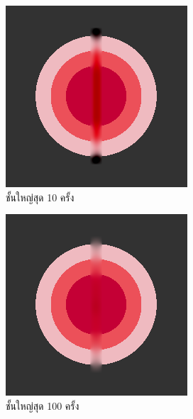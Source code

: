 \documentclass[hidelinks, a4paper,12pt]{article}
\numberwithin{equation}{section}							%
\numberwithin{equation}{section}
\begin{document}
{	\begin{figure}[H]
		\centering
		\begin{subfigure}{0.23\linewidth}
			\centering
			\includegraphics[width=0.8\linewidth]{images/just10enough/only10time.png}
			\caption{ชั้นใหญ่สุด 10 ครั้ง}
		\end{subfigure}
		\begin{subfigure}{0.23\linewidth}
			\centering
			\includegraphics[width=0.8\linewidth]{images/just10enough/only100time.png}
			\caption{ชั้นใหญ่สุด 100 ครั้ง}
		\end{subfigure}
		\begin{subfigure}{0.23\linewidth}

\end{subfigure}
\end{figure}}
\end{document}
